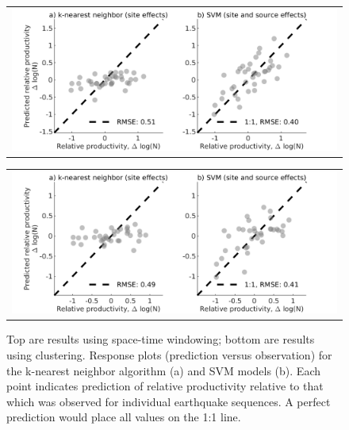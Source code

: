 \documentclass[draft]{agujournal}
\begin{document}
\newpage
\begin{figure}[H]
    \centering
    \begin{tabular}{@{}c@{}}
        \includegraphics{figures/response.png}
    \end{tabular}
    
    \begin{tabular}{@{}c@{}}
        \includegraphics{figures/response_z2008.png}
    \end{tabular}
    
    \caption{Top are results using space-time windowing; bottom are results using \citet{Zaliapin2008} clustering. Response plots (prediction versus observation) for the k-nearest neighbor algorithm (a) and SVM models (b). Each point indicates prediction of relative productivity relative to that which was observed for individual earthquake sequences. A perfect prediction would place all values on the 1:1 line.}
        \label{fig:response_z2008}
\end{figure}
\end{document}
